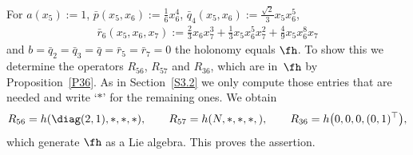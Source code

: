 \begin{Example}\label{Ex37}
For $a(x_5):=1$, $\bar p(x_5,x_6):=\frac16 x_6^4$, $\bar q_4(x_5,x_6):=\frac {\sqrt2}3x_5 x_6^5$, \begin{gather*}\bar r_6(x_5,x_6,x_7):= \tfrac23 x_6 x_7^3+\tfrac13 x_5x_6^5 x_7^2+\tfrac 49 x_5x_6^8x_7 \end{gather*}
and $b=\bar q_2=\bar q_3 =\bar q=\bar r_5= \bar r_7=0$ the holonomy equals $\fh$. To show this we determine the operators $R_{56}$, $R_{57}$ and $R_{36}$, which are in~$\fh$ by Proposition~\ref{P36}. As in Section~\ref{S3.2} we only compute those entries that are needed and write `$*$' for the remaining ones. We obtain
\begin{gather*}R_{56}=h(\diag(2,1), *,*,*),\qquad R_{57}=h(N,*,*,*,),\qquad R_{36}=h\big(0,0,0,(0,1)^\top\big),\end{gather*}
which generate $\fh$ as a Lie algebra. This proves the assertion.
\end{Example}

